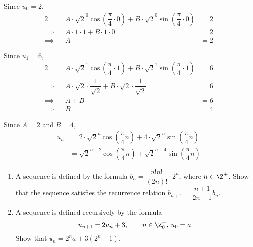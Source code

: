 \documentclass{echw}
\begin{document}
            Since $u_0 = 2$,            
            \begin{alignat*}{2}
                && A \cdot \sqrt{2}^0 \cos \left(\dfrac{\pi}4 \cdot 0 \right) + B \cdot \sqrt{2}^0 \sin \left(\dfrac{\pi}4 \cdot 0\right) &= 2\\
                \implies&& A \cdot 1 \cdot 1 + B \cdot 1 \cdot 0 &= 2\\
                \implies&& A &= 2
            \end{alignat*}

            Since $u_1 = 6$,
            \begin{alignat*}{2}
                && A \cdot \sqrt{2}^1 \cos \left(\dfrac{\pi}4 \cdot 1 \right) + B \cdot \sqrt{2}^1 \sin \left(\dfrac{\pi}4 \cdot 1\right) &= 6\\
                \implies&& A \cdot \sqrt{2} \cdot \dfrac{1}{\sqrt2} + B \cdot \sqrt{2} \cdot \dfrac{1}{\sqrt2} &= 6\\
                \implies&& A + B &= 6\\
                \implies&& B &= 4
            \end{alignat*}

            Since $A = 2$ and $B = 4$,
            \begin{align*}
                u_n &= 2 \cdot \sqrt{2}^n \cos \left(\dfrac{\pi}4 n \right) + 4 \cdot \sqrt{2}^n \sin \left(\dfrac{\pi}4 n\right)\\
                &= \sqrt{2}^{n+2} \cos \left(\dfrac{\pi}4 n \right) + \sqrt{2}^{n+4} \sin \left(\dfrac{\pi}4 n\right)
            \end{align*}

    \problem{}
        \begin{enumerate}
            \item A sequence is defined by the formula $b_n = \dfrac{n!n!}{(2n)!}\cdot2^n$, where $n \in \Z^+$. Show that the sequence satisfies the recurrence relation $b_{n+1} = \dfrac{n+1}{2n+1} b_n$.
            \item A sequence is defined recursively by the formula
            \begin{equation*}
                u_{n+1} = 2u_n + 3, \qquad n \in \Z_0^+, \, u_0 = a
            \end{equation*}
            Show that $u_n = 2^na+3\left(2^n - 1\right)$.
        \end{enumerate}

    \solution
\end{document}
